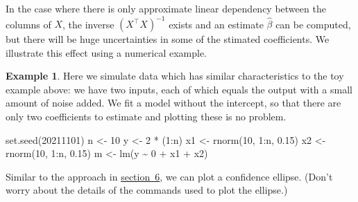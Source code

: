 \documentclass[
  a4paper,
]{article}
\newenvironment{Shaded}{\begin{snugshade}}{\end{snugshade}}
\newcommand{\DecValTok}[1]{\textcolor[rgb]{0.00,0.00,0.81}{#1}}
\newcommand{\FloatTok}[1]{\textcolor[rgb]{0.00,0.00,0.81}{#1}}
\newcommand{\FunctionTok}[1]{\textcolor[rgb]{0.00,0.00,0.00}{#1}}
\newcommand{\NormalTok}[1]{#1}
\newcommand{\OtherTok}[1]{\textcolor[rgb]{0.56,0.35,0.01}{#1}}
\newcommand{\SpecialCharTok}[1]{\textcolor[rgb]{0.00,0.00,0.00}{#1}}
\theoremstyle{definition}
\theoremstyle{definition}
\newtheorem{example}{Example}[section]
\theoremstyle{definition}
\theoremstyle{definition}
\theoremstyle{remark}
\begin{document}
In the case where there is only approximate linear dependency between the
columns of \(X\), the inverse \((X^\top X)^{-1}\) exists and an estimate \(\hat\beta\)
can be computed, but there will be huge uncertainties in some of the stimated
coefficients. We illustrate this effect using a numerical example.

\begin{example}
\protect\hypertarget{exm:mulcollell}{}\label{exm:mulcollell}Here we simulate data which has similar characteristics to the toy
example above: we have two inputs, each of which equals the
output with a small amount of noise added. We
fit a model without the intercept, so that there are only two
coefficients to estimate and plotting these is no problem.

\begin{Shaded}
\begin{Highlighting}[]
\FunctionTok{set.seed}\NormalTok{(}\DecValTok{20211101}\NormalTok{)}
\NormalTok{n }\OtherTok{\textless{}{-}} \DecValTok{10}
\NormalTok{y }\OtherTok{\textless{}{-}} \DecValTok{2} \SpecialCharTok{*}\NormalTok{ (}\DecValTok{1}\SpecialCharTok{:}\NormalTok{n)}
\NormalTok{x1 }\OtherTok{\textless{}{-}} \FunctionTok{rnorm}\NormalTok{(}\DecValTok{10}\NormalTok{, }\DecValTok{1}\SpecialCharTok{:}\NormalTok{n, }\FloatTok{0.15}\NormalTok{)}
\NormalTok{x2 }\OtherTok{\textless{}{-}} \FunctionTok{rnorm}\NormalTok{(}\DecValTok{10}\NormalTok{, }\DecValTok{1}\SpecialCharTok{:}\NormalTok{n, }\FloatTok{0.15}\NormalTok{)}
\NormalTok{m }\OtherTok{\textless{}{-}} \FunctionTok{lm}\NormalTok{(y }\SpecialCharTok{\textasciitilde{}} \DecValTok{0} \SpecialCharTok{+}\NormalTok{ x1 }\SpecialCharTok{+}\NormalTok{ x2)}
\end{Highlighting}
\end{Shaded}

Similar to the approach in \protect\hyperlink{coordinates-of-the-outline}{section~6},
we can plot a confidence ellipse. (Don't worry about the details of the
commands used to plot the ellipse.)


\end{example}
\end{document}
